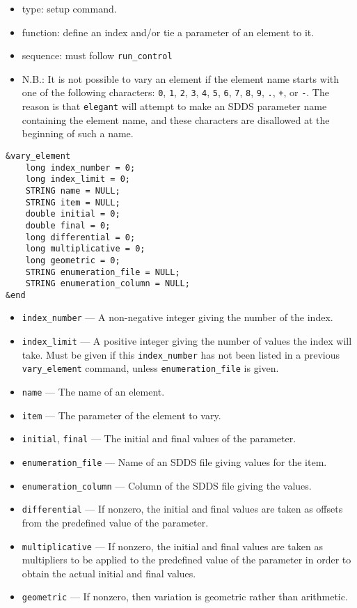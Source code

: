 \documentclass[11pt]{article}
\begin{document}
\begin{itemize}
\item type: setup command.
\item function: define an index and/or tie a parameter of an element to it.
\item sequence: must follow \verb|run_control|
\item N.B.: It is not possible to vary an element if the element name starts with one of the following
characters: 
\verb|0|, \verb|1|, \verb|2|, \verb|3|, \verb|4|, \verb|5|, \verb|6|, \verb|7|, \verb|8|,
\verb|9|, \verb|.|, \verb|+|, or \verb|-|.  The reason is that {\tt elegant} will attempt to 
make an SDDS parameter name containing the element name, and these characters are disallowed
at the beginning of such a name.
\end{itemize}

\begin{verbatim}
&vary_element
    long index_number = 0;
    long index_limit = 0;
    STRING name = NULL;
    STRING item = NULL;
    double initial = 0;
    double final = 0;
    long differential = 0;
    long multiplicative = 0;
    long geometric = 0;
    STRING enumeration_file = NULL;
    STRING enumeration_column = NULL;
&end
\end{verbatim}

\begin{itemize}
\item \verb|index_number| --- A non-negative integer giving the number of the index.
\item \verb|index_limit| --- A positive integer giving the number of values the index will take.
 Must be given if this \verb|index_number| has not been listed in a previous \verb|vary_element|
command, unless \verb|enumeration_file| is given.
\item \verb|name| --- The name of an element.
\item \verb|item| --- The parameter of the element to vary.
\item \verb|initial|, \verb|final| --- The initial and final values of the parameter.
\item \verb|enumeration_file| --- Name of an SDDS file giving values for the item.
\item \verb|enumeration_column| --- Column of the SDDS file giving the values.
\item \verb|differential| --- If nonzero, the initial and final values are taken as
offsets from the predefined value of the parameter.
\item \verb|multiplicative| --- If nonzero, the initial and final values are taken as 
multipliers to be applied to the predefined value of the parameter in order to obtain
the actual initial and final values.
\item \verb|geometric| --- If nonzero, then variation is geometric rather than 
arithmetic.
\end{itemize}
\end{document}
